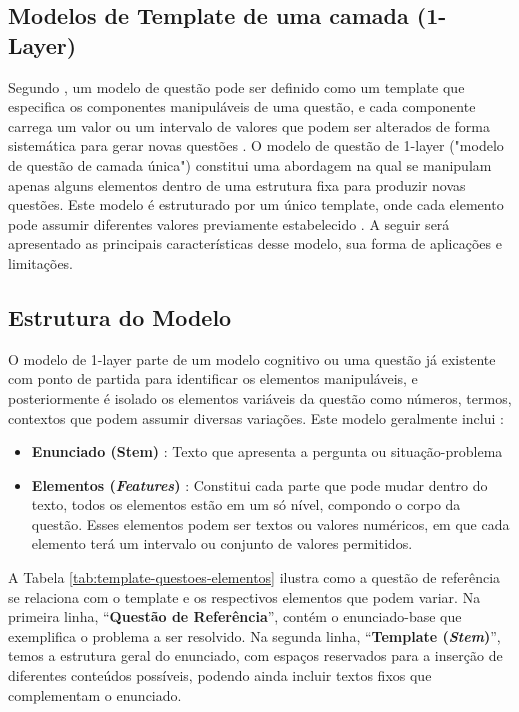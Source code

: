 \subsection{Modelos de Template de uma camada (1-Layer)}

Segundo \parencite{gierl2021}, um modelo de questão pode ser definido como um template que especifica os componentes manipuláveis de uma questão, e cada componente carrega um valor ou um intervalo de valores que podem ser alterados de forma sistemática para gerar novas questões . O modelo de questão de 1-layer ("modelo de questão de camada única") constitui uma abordagem na qual se manipulam apenas alguns elementos dentro de uma estrutura fixa para produzir novas questões. Este modelo é estruturado por um único template, onde cada elemento pode assumir diferentes valores previamente estabelecido \parencite{lai2013}. A seguir será apresentado as principais características desse modelo, sua forma de aplicações e limitações.

\subsection{Estrutura do Modelo}

O modelo de 1-layer parte de um modelo cognitivo ou uma questão já existente com ponto de partida para identificar os elementos manipuláveis, e posteriormente é isolado os elementos variáveis da questão como números, termos, contextos que podem assumir diversas variações. Este modelo geralmente inclui : 

\begin{itemize}
    \item \textbf{Enunciado (Stem)} : Texto que apresenta a pergunta ou situação-problema
    \item \textbf{Elementos (\textit{Features})} : Constitui cada parte que pode mudar dentro do texto, todos os elementos estão em um só nível, compondo o corpo da questão. Esses elementos podem ser textos ou valores numéricos, em que cada elemento terá um intervalo ou conjunto de valores permitidos.
\end{itemize}

A Tabela \ref{tab:template-questoes-elementos} ilustra como a questão de referência se relaciona com o template e os respectivos elementos que podem variar. Na primeira linha, “\textbf{Questão de Referência}”, contém o enunciado-base que exemplifica o problema a ser resolvido. Na segunda linha, “\textbf{Template (\textit{Stem})}”, temos a estrutura geral do enunciado, com espaços reservados para a inserção de diferentes conteúdos possíveis, podendo ainda incluir textos fixos que complementam o enunciado.



